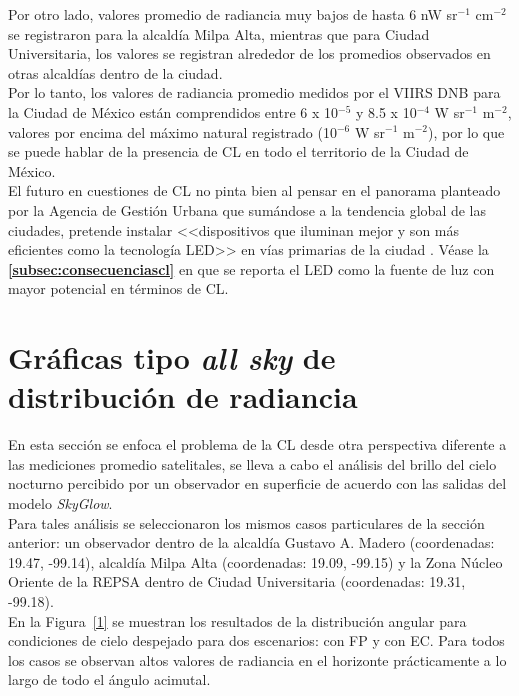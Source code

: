 \newpage

Por otro lado, valores promedio de radiancia muy bajos de hasta 6 nW sr$^{-1}$  cm$^{-2}$ se registraron para la alcaldía Milpa Alta, mientras que para Ciudad Universitaria, los valores se registran alrededor de los promedios observados en otras alcaldías dentro de la ciudad.\\

Por lo tanto, los valores de radiancia promedio medidos por el VIIRS DNB para la Ciudad de México están comprendidos entre 6 x 10$^{-5}$ y 8.5 x 10$^{-4}$ W sr$^{-1}$ m$^{-2}$, valores por encima del máximo natural registrado (10$^{-6}$ W sr$^{-1}$  m$^{-2}$), por lo que se puede hablar de la presencia de CL en todo el territorio de la Ciudad de México.\\ 

El futuro en cuestiones de CL no pinta bien al pensar en el panorama planteado por la Agencia de Gestión Urbana que sumándose a la tendencia global de las ciudades, pretende instalar <<dispositivos que iluminan mejor y son más eficientes como la tecnología LED>> en vías primarias de la ciudad \citep{Universal2017}. Véase la \textbf{\autoref{subsec:consecuenciascl}} en que se reporta el LED como la fuente de luz con mayor potencial en términos de CL.\\ 


\section{Gráficas tipo \textit{all sky} de distribución de radiancia}

En esta sección se enfoca el problema de la CL desde otra perspectiva diferente a las mediciones promedio satelitales, se lleva a cabo el análisis del brillo del cielo nocturno percibido por un observador en superficie de acuerdo con las salidas del modelo \textit{SkyGlow}.\\ 

Para tales análisis se seleccionaron los mismos casos particulares de la sección anterior: un observador dentro de la alcaldía Gustavo A. Madero (coordenadas: 19.47\grad, -99.14\grad), alcaldía Milpa Alta (coordenadas: 19.09\grad, -99.15\grad) y la Zona Núcleo Oriente de la REPSA dentro de Ciudad Universitaria (coordenadas: 19.31\grad, -99.18\grad).\\

En la Figura~\ref{1} se muestran los resultados de la distribución angular para condiciones de cielo despejado para dos escenarios: con FP y con EC. Para todos los casos se observan altos valores de radiancia en el horizonte prácticamente a lo largo de todo el ángulo acimutal.\\

